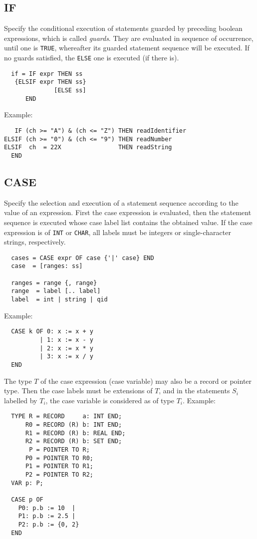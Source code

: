 \subsection{IF}
Specify the conditional execution of statements guarded by preceding boolean expressions,
which is called \emph{guards}. They are evaluated in sequence of occurrence, until one is
\verb|TRUE|, whereafter its guarded statement sequence will be executed. If no guards
satisfied, the \verb|ELSE| one is executed (if there is).
\begin{verbatim}
  if = IF expr THEN ss
   {ELSIF expr THEN ss}
              [ELSE ss]
      END
\end{verbatim}
Example:
\begin{verbatim}
   IF (ch >= "A") & (ch <= "Z") THEN readIdentifier
ELSIF (ch >= "0") & (ch <= "9") THEN readNumber
ELSIF  ch  = 22X                THEN readString
  END
\end{verbatim}

\subsection{CASE}
Specify the selection and execution of a statement sequence according to the value of an
expression. First the case expression is evaluated, then the statement sequence is executed
whose case label list contains the obtained value. If the case expression is of \verb|INT|
or \verb|CHAR|, all labels must be integers or single-character strings, respectively.
\begin{verbatim}
  cases = CASE expr OF case {'|' case} END
  case  = [ranges: ss]
 
  ranges = range {, range}
  range  = label [.. label]
  label  = int | string | qid
\end{verbatim}
Example:
\begin{verbatim}
  CASE k OF 0: x := x + y
          | 1: x := x - y
          | 2: x := x * y
          | 3: x := x / y
  END
\end{verbatim}

The type $T$ of the case expression (case variable) may also be a record or pointer type.
Then the case labels must be extensions of $T$, and in the statements $S_i$ labelled by
$T_i$, the case variable is considered as of type $T_i$.  Example:
\begin{verbatim}
  TYPE R = RECORD     a: INT END;
      R0 = RECORD (R) b: INT END;
      R1 = RECORD (R) b: REAL END;
      R2 = RECORD (R) b: SET END;
       P = POINTER TO R;
      P0 = POINTER TO R0;
      P1 = POINTER TO R1;
      P2 = POINTER TO R2;
  VAR p: P;
 
  CASE p OF
    P0: p.b := 10  |
    P1: p.b := 2.5 |
    P2: p.b := {0, 2}
  END
\end{verbatim}

